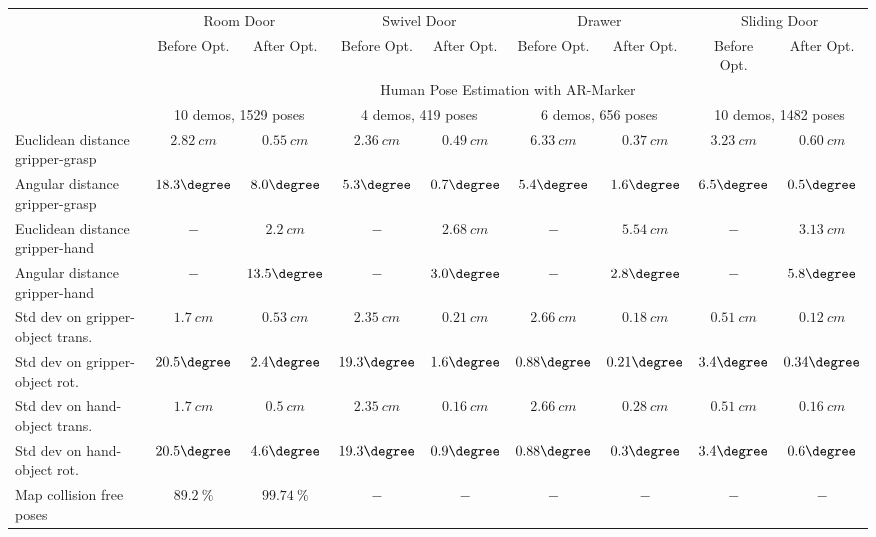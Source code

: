 \setlength{\tabcolsep}{5pt}
\begin{table*}
\centering
\begin{tabular}{l | c c | c c | c c | c c |}
&\multicolumn{2}{c|}{Room Door} &\multicolumn{2}{c|}{Swivel Door} &\multicolumn{2}{c|}{Drawer}    &\multicolumn{2}{c|}{Sliding Door}\\
& Before Opt.		& After Opt.			& Before Opt.		& After Opt.			& Before Opt.		& After Opt.			& Before Opt.	& After Opt.\\
\hline
& \multicolumn{8}{c|}{Human Pose Estimation with AR-Marker}\\ 
&\multicolumn{2}{c|}{10 demos, 1529 poses}  &\multicolumn{2}{c|}{4 demos, 419 poses}    &\multicolumn{2}{c|}{6 demos, 656 poses} &\multicolumn{2}{c|}{10 demos, 1482 poses}\\
\hline
 Euclidean distance gripper-grasp	& $\SI{2.82}{cm}$	& $\SI{0.55}{cm}$	& $\SI{2.36}{cm}$	& $\SI{0.49}{cm}$	& $\SI{6.33}{cm}$	& $\SI{0.37}{cm}$	& $\SI{3.23}{cm}$	& $\SI{0.60}{cm}$\\
 Angular distance gripper-grasp		& $18.3\degree$		& $8.0\degree$		& $5.3 \degree$		& $0.7 \degree$		& $5.4\degree$		& $1.6\degree$ 		& $6.5\degree$	& $0.5\degree$\\
 Euclidean distance gripper-hand		& $-$				& $\SI{2.2}{cm}$		& $-$				& $\SI{2.68}{cm}$	& $-$				& $\SI{5.54}{cm}$ 	& $-$	& $\SI{3.13}{cm}$\\
 Angular distance gripper-hand		& $-$				& $13.5 \degree$		& $-$				& $3.0 \degree$		& $-$				& $2.8\degree$ 		& $-$ &$5.8\degree$\\
 Std dev on gripper-object trans.	& $\SI{1.7}{cm}$		& $\SI{0.53}{cm}$	& $\SI{2.35}{cm}$	& $\SI{0.21}{cm}$	& $\SI{2.66}{cm}$		& $\SI{0.18}{cm}$	& $\SI{0.51}{cm}$ 	& $\SI{0.12}{cm}$\\
 Std dev on gripper-object rot.		& $20.5\degree$		& $2.4 \degree$		& $19.3\degree$		& $1.6\degree$		& $0.88\degree$		& $0.21\degree$		& $3.4\degree$ & $0.34\degree$\\
 Std dev on hand-object trans.		& $\SI{1.7}{cm}$		& $\SI{0.5}{cm}$		& $\SI{2.35}{cm}$	& $\SI{0.16}{cm}$	& $\SI{2.66}{cm}$	& $\SI{0.28}{cm}$ 	& $\SI{0.51}{cm}$	& $\SI{0.16}{cm}$\\
 Std dev on hand-object rot.			& $20.5\degree$		& $4.6\degree$		& $19.3\degree$		& $0.9\degree$		& $0.88\degree$		& $0.3\degree$ 		& $3.4\degree$	& $0.6\degree$\\ 
 Map collision free poses			& $\SI{89.2}{\%}$	& $\SI{99.74}{\%}$	& $-$				& $-$				& $-$				& $-$ 				& $-$	& $-$\\

\end{tabular}
\end{table*}
